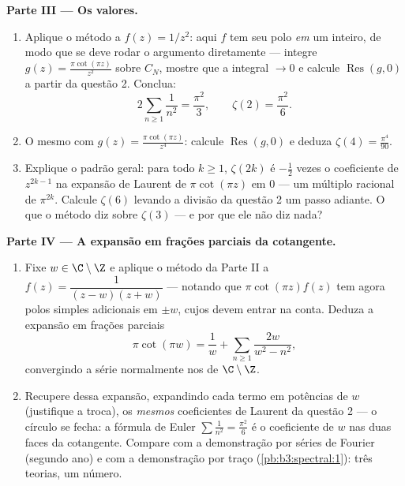 \begin{problem}
\medskip
\noindent\textbf{Parte III --- Os valores.}
\begin{enumerate}[resume]
  \item Aplique o método a $f(z) = 1/z^2$: aqui $f$ tem seu polo \emph{em} um
        inteiro, de modo que se deve rodar o argumento diretamente ---
        integre $g(z) = \frac{\pi\cot(\pi
        z)}{z^2}$ sobre $C_N$, mostre que a integral $\to 0$
        e calcule $\operatorname{Res}(g, 0)$ a partir da questão 2. Conclua:
        \[
        2\sum_{n\geq1}\frac1{n^2} = \frac{\pi^2}{3},
        \qquad \zeta(2) = \frac{\pi^2}6 .
        \]
  \item O mesmo com $g(z) = \frac{\pi\cot(\pi z)}{z^4}$: calcule $\operatorname{Res}(g, 0)$ e deduza $\zeta(4) = \frac{\pi^4}{90}$.
  \item Explique o padrão geral: para todo $k \geq 1$, $\zeta(2k)$ é $-\frac12$ vezes o
        coeficiente de $z^{2k-1}$ na expansão de Laurent de $\pi\cot(\pi
        z)$ em $0$
        --- um múltiplo racional de $\pi^{2k}$. Calcule $\zeta(6)$ levando a
        divisão da questão 2 um passo adiante. O que o método diz sobre
        $\zeta(3)$ --- e por que ele não diz nada?
\end{enumerate}

\medskip
\noindent\textbf{Parte IV --- A expansão em frações parciais da
cotangente.}
\begin{enumerate}[resume]
  \item Fixe $w \in \C\setminus\Z$ e aplique o método da Parte II a $f(z) = \dfrac{1}{(z - w)(z + w)}$ --- notando
        que $\pi\cot(\pi z)f(z)$ tem agora polos simples adicionais em $\pm w$,
        cujos  devem entrar na conta. Deduza a expansão em
        frações parciais
        \[
        \pi\cot(\pi w) = \frac1w +
        \sum_{n\geq1}\frac{2w}{w^2 - n^2},
        \]
        convergindo a série normalmente nos  de $\C\setminus\Z$.
  \item Recupere dessa expansão, expandindo cada termo em potências de
        $w$ (justifique a troca), os \emph{mesmos} coeficientes de
        Laurent da questão 2 --- o círculo se fecha: a fórmula de Euler
        $\sum\frac1{n^2} = \frac{\pi^2}6$ é o coeficiente de $w$ nas duas faces da cotangente.
        Compare com a demonstração por séries de Fourier (segundo ano)
        e com a demonstração por traço (\cref{pb:b3:spectral:1}): três teorias, um
        número.
\end{enumerate}


\end{problem}
